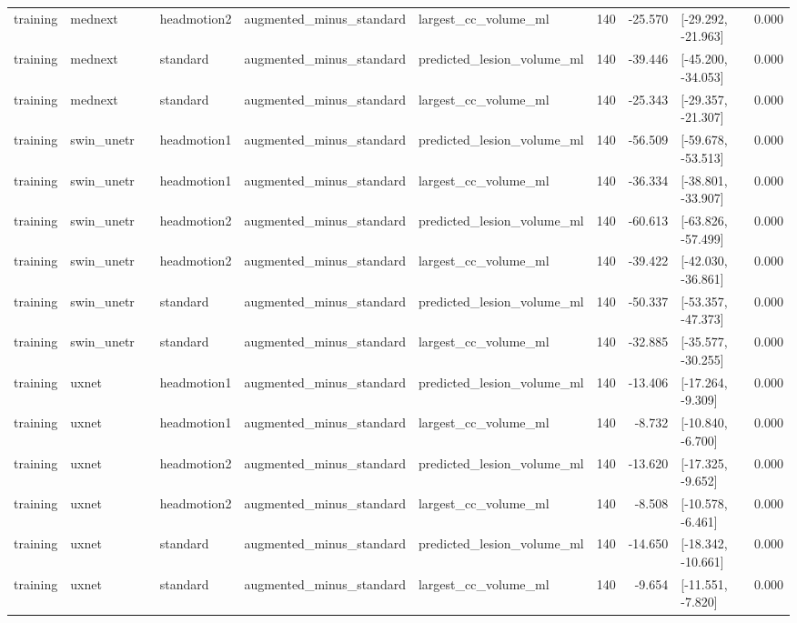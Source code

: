 \begin{table}
\begin{tabular}{llllllrrlr}
training & mednext &  & headmotion2 & augmented\_minus\_standard & largest\_cc\_volume\_ml & 140 & -25.570 & [-29.292, -21.963] & 0.000 \\
training & mednext &  & standard & augmented\_minus\_standard & predicted\_lesion\_volume\_ml & 140 & -39.446 & [-45.200, -34.053] & 0.000 \\
training & mednext &  & standard & augmented\_minus\_standard & largest\_cc\_volume\_ml & 140 & -25.343 & [-29.357, -21.307] & 0.000 \\
training & swin\_unetr &  & headmotion1 & augmented\_minus\_standard & predicted\_lesion\_volume\_ml & 140 & -56.509 & [-59.678, -53.513] & 0.000 \\
training & swin\_unetr &  & headmotion1 & augmented\_minus\_standard & largest\_cc\_volume\_ml & 140 & -36.334 & [-38.801, -33.907] & 0.000 \\
training & swin\_unetr &  & headmotion2 & augmented\_minus\_standard & predicted\_lesion\_volume\_ml & 140 & -60.613 & [-63.826, -57.499] & 0.000 \\
training & swin\_unetr &  & headmotion2 & augmented\_minus\_standard & largest\_cc\_volume\_ml & 140 & -39.422 & [-42.030, -36.861] & 0.000 \\
training & swin\_unetr &  & standard & augmented\_minus\_standard & predicted\_lesion\_volume\_ml & 140 & -50.337 & [-53.357, -47.373] & 0.000 \\
training & swin\_unetr &  & standard & augmented\_minus\_standard & largest\_cc\_volume\_ml & 140 & -32.885 & [-35.577, -30.255] & 0.000 \\
training & uxnet &  & headmotion1 & augmented\_minus\_standard & predicted\_lesion\_volume\_ml & 140 & -13.406 & [-17.264, -9.309] & 0.000 \\
training & uxnet &  & headmotion1 & augmented\_minus\_standard & largest\_cc\_volume\_ml & 140 & -8.732 & [-10.840, -6.700] & 0.000 \\
training & uxnet &  & headmotion2 & augmented\_minus\_standard & predicted\_lesion\_volume\_ml & 140 & -13.620 & [-17.325, -9.652] & 0.000 \\
training & uxnet &  & headmotion2 & augmented\_minus\_standard & largest\_cc\_volume\_ml & 140 & -8.508 & [-10.578, -6.461] & 0.000 \\
training & uxnet &  & standard & augmented\_minus\_standard & predicted\_lesion\_volume\_ml & 140 & -14.650 & [-18.342, -10.661] & 0.000 \\
training & uxnet &  & standard & augmented\_minus\_standard & largest\_cc\_volume\_ml & 140 & -9.654 & [-11.551, -7.820] & 0.000 \\
\bottomrule
\end{tabular}
\end{table}
